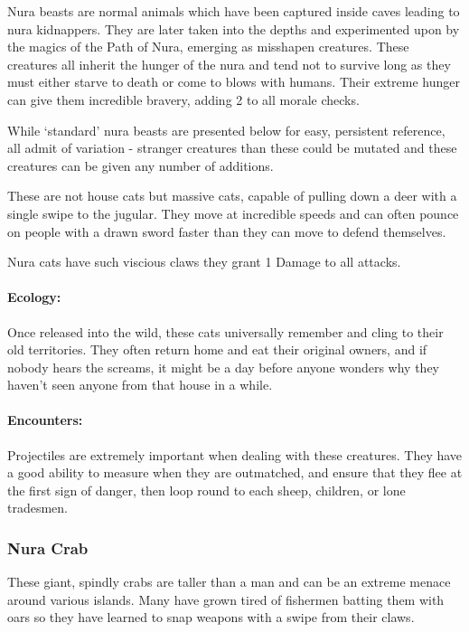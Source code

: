 \begin{multicols}{2}

Nura beasts are normal animals which have been captured inside caves leading to nura kidnappers.  They are later taken into the depths and experimented upon by the magics of the Path of Nura, emerging as misshapen creatures.  These creatures all inherit the hunger of the nura and tend not to survive long as they must either starve to death or come to blows with humans.  Their extreme hunger can give them incredible bravery, adding 2 to all morale checks.

	While `standard' nura beasts are presented below for easy, persistent reference, all admit of variation - stranger creatures than these could be mutated and these creatures can be given any number of additions.

\label{nura_cat}

These are not house cats but massive cats, capable of pulling down a deer with a single swipe to the jugular.  They move at incredible speeds and can often pounce on people with a drawn sword faster than they can move to defend themselves.

Nura cats have such viscious claws they grant 1 Damage to all attacks.

\paragraph{Ecology:} Once released into the wild, these cats universally remember and cling to their old territories.
They often return home and eat their original owners, and if nobody hears the screams, it might be a day before anyone wonders why they haven't seen anyone from that house in a while.
\paragraph{Encounters:} Projectiles are extremely important when dealing with these creatures.
They have a good ability to measure when they are outmatched, and ensure that they flee at the first sign of danger, then loop round to each sheep, children, or lone tradesmen.

\nuracat

\subsubsection{Nura Crab}\label{nura_crab}

These giant, spindly crabs are taller than a man and can be an extreme menace around various islands.  Many have grown tired of fishermen batting them with oars so they have learned to snap weapons with a swipe from their claws.


\end{multicols}
